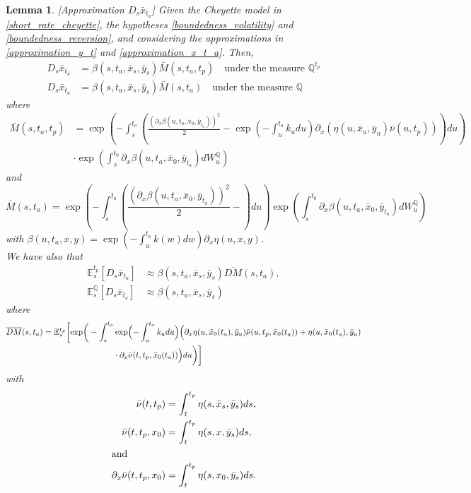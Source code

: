 \documentclass[a4paper,10pt]{article}
\newtheorem{lemma}[theorem]{Lemma}
\newcommand{\1}{\mathbf{1}}
\begin{document}
\begin{lemma}\label{DsX}[Approximation $D_s \bar{x}_{t_a}$]
Given the Cheyette model in \eqref{short_rate_cheyette}, the hypotheses \ref{boundedness_volatility} and \ref{boundedness_reversion}, and considering the approximations in \eqref{approximation_y_t} and \eqref{approximation_x_t_a}. Then, 
\begin{align}\label{approximation_D_s_x_t}
D_s \bar{x}_{t_a} &= \beta(s,t_a,\bar{x}_s,\bar{y}_s) \bar{M}(s,t_a,t_p) \quad \text{under the measure $\mathbb{Q}^{t_p}$} \nonumber \\
D_s \bar{x}_{t_a} &= \beta(s,t_a,\bar{x}_s,\bar{y}_s) \bar{M}(s,t_a)  \quad \text{under the measure $\mathbb{Q}$}
\end{align}
where
\begin{align*}
\bar{M}(s,t_a,t_p) &= \exp\left(-\int_{s}^{t_a} \left( \frac{\left(\partial_x \beta(u,t_a,\bar{x}_0,\bar{y}_{t_a})\right)^{2}}{2} - \exp\left(-\int_{u}^{t_a}k_u du\right) \partial_x (\eta(u, \bar{x}_u, \bar{y}_{u}) \bar{\nu}(u,t_p))\right) du \right) \\ 
&\cdot\exp\left(\int_{s}^{t_0} \partial_x \beta(u,t_a,\bar{x}_0,\bar{y}_{t_a}) dW^{\mathbb{Q}}_u \right)
\end{align*}
and
\begin{equation*}
\bar{M}(s,t_a) = \exp\left(-\int_{s}^{t_a} \left( \frac{\left(\partial_x \beta(u,t_a,\bar{x}_0,\bar{y}_{t_a})\right)^{2}}{2} - \right) du \right) \exp\left(\int_{s}^{t_0} \partial_x \beta(u,t_a,\bar{x}_0,\bar{y}_{t_a}) dW^{\mathbb{Q}}_u \right)
\end{equation*} 
with $\beta(u,t_a,x,y) = \exp\left(-\int_{u}^{t_a}k(w)dw\right) \partial_x \eta(u,x,y)$.\\

We have also that
\begin{align}\label{approsimation_E_s_x_t}
\mathbb{E}_s^{t_p}\left[D_s \bar{x}_{t_a}\right] &\approx \beta(s,t_a,\bar{x}_s,\bar{y}_s) \overline{DM}(s,t_a), \nonumber \\
\mathbb{E}_s^{\mathbb{Q}}\left[D_s \bar{x}_{t_a}\right]&\approx \beta(s,t_a,\bar{x}_s,\bar{y}_s)
\end{align}
where 
\begin{align*}
\overline{DM}(s,t_a) &= \mathbb{E}^{t_p}_s\biggl[\exp\biggr(-\int_{s}^{t_a} \exp\Bigl(-\int_{u}^{t_a}k_u du\Bigr) \Bigl(\partial_x \eta(u, \bar{x}_0(t_a), \bar{y}_{u}) \bar{\nu}(u,t_p, \bar{x}_0(t_a)) + \eta(u,\bar{x}_0(t_a), \bar{y}_{u}) \\
\qquad &\hspace{3cm} \cdot \partial_x \bar{\nu} (t,t_p, \bar{x}_0(t_a))\Bigr) du\biggr)\biggr]
\end{align*}
with  
\begin{align*}
\bar{\nu}(t,t_p) &= \int_{t}^{t_p} \eta(s,\bar{x}_s,\bar{y}_s) ds, \\
\bar{\nu}(t,t_p, x_0) &= \int_{t}^{t_p} \eta(s,x,\bar{y}_s) ds,\\
\intertext{and}
\partial_x \bar{\nu}(t,t_p,x_0) &= \int_{t}^{t_p} \eta(s,x_0,\bar{y}_s) ds.
\end{align*}
\end{lemma}
\end{document}
